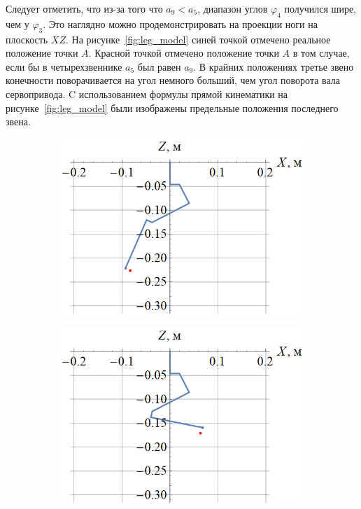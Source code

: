 Следует отметить, что из-за того что $ a_9 < a_5 $, диапазон углов $ \varphi_4 $ получился шире, чем у $ \varphi_3 $. Это наглядно можно продемонстрировать на проекции ноги на плоскость $ XZ $. На рисунке~\ref{fig:leg_model} синей точкой отмечено реальное положение точки $ A $. Красной точкой отмечено положение точки $ A $ в том случае, если бы в четырехзвеннике $ a_5 $ был равен $ a_9 $. В крайних положениях третье звено конечности поворачивается на угол немного больший, чем угол поворота вала сервопривода. C использованием формулы прямой кинематики на рисунке~\ref{fig:leg_model} были изображены предельные положения последнего звена.
\begin{figure}[ht]
    \centering
    \begin{subfigure}[b]{0.45\textwidth}    
        \centering
        \includegraphics[scale=0.4]{chapter_kinematics/figure5.png}
        \caption{}
    \end{subfigure}
    \begin{subfigure}[b]{0.45\textwidth}
        \centering
        \includegraphics[scale=0.4]{chapter_kinematics/figure6.png}
        \caption{}
    \end{subfigure}


\end{figure}
